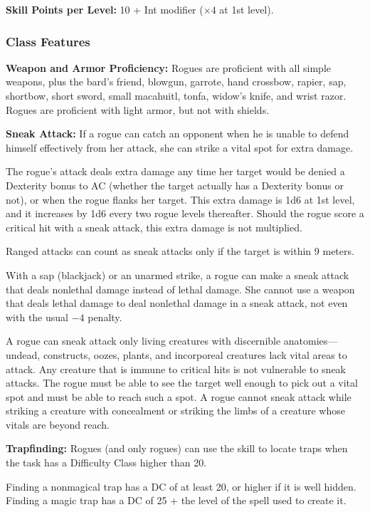 \textbf{Skill Points per Level:} 10 + Int modifier ($\times4$ at 1st level).

\subsubsection{Class Features}
\textbf{Weapon and Armor Proficiency:} Rogues are proficient with all simple weapons, plus the bard's friend, blowgun, garrote, hand crossbow, rapier, sap, shortbow, short sword, small macahuitl, tonfa, widow's knife, and wrist razor. Rogues are proficient with light armor, but not with shields.

\textbf{Sneak Attack:} If a rogue can catch an opponent when he is unable to defend himself effectively from her attack, she can strike a vital spot for extra damage.

The rogue's attack deals extra damage any time her target would be denied a Dexterity bonus to AC (whether the target actually has a Dexterity bonus or not), or when the rogue flanks her target. This extra damage is 1d6 at 1st level, and it increases by 1d6 every two rogue levels thereafter. Should the rogue score a critical hit with a sneak attack, this extra damage is not multiplied.

Ranged attacks can count as sneak attacks only if the target is within 9 meters.

With a sap (blackjack) or an unarmed strike, a rogue can make a sneak attack that deals nonlethal damage instead of lethal damage. She cannot use a weapon that deals lethal damage to deal nonlethal damage in a sneak attack, not even with the usual $-4$ penalty.

A rogue can sneak attack only living creatures with discernible anatomies---undead, constructs, oozes, plants, and incorporeal creatures lack vital areas to attack. Any creature that is immune to critical hits is not vulnerable to sneak attacks. The rogue must be able to see the target well enough to pick out a vital spot and must be able to reach such a spot. A rogue cannot sneak attack while striking a creature with concealment or striking the limbs of a creature whose vitals are beyond reach.

\textbf{Trapfinding:} Rogues (and only rogues) can use the  skill to locate traps when the task has a Difficulty Class higher than 20.

Finding a nonmagical trap has a DC of at least 20, or higher if it is well hidden. Finding a magic trap has a DC of 25 + the level of the spell used to create it.


